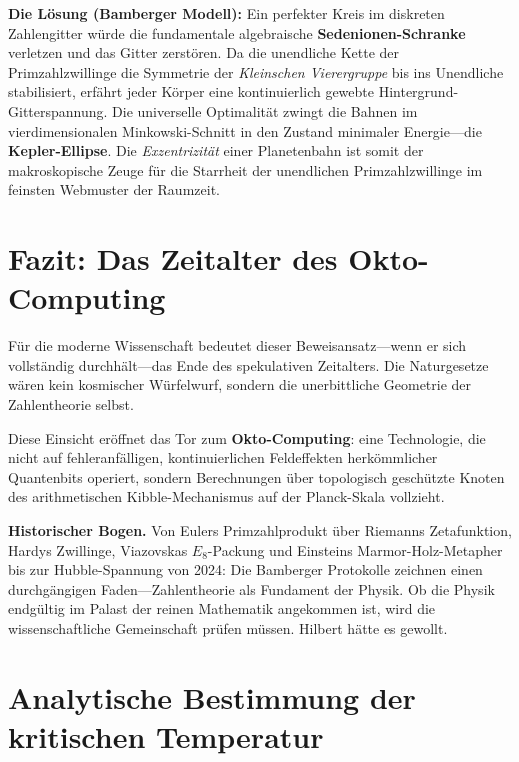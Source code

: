 \documentclass[11pt,a4paper]{article}
\newcommand{\Eoct}{E_8}
\begin{document}
\textbf{Die Lösung (Bamberger Modell):} Ein perfekter Kreis im diskreten Zahlengitter würde die fundamentale algebraische \textbf{Sedenionen-Schranke} verletzen und das Gitter zerstören. Da die unendliche Kette der Primzahlzwillinge die Symmetrie der \emph{Kleinschen Vierergruppe} bis ins Unendliche stabilisiert, erfährt jeder Körper eine kontinuierlich gewebte Hintergrund-Gitterspannung. Die universelle Optimalität zwingt die Bahnen im vierdimensionalen Minkowski-Schnitt in den Zustand minimaler Energie---die \textbf{Kepler-Ellipse}. Die \emph{Exzentrizität} einer Planetenbahn ist somit der makroskopische Zeuge für die Starrheit der unendlichen Primzahlzwillinge im feinsten Webmuster der Raumzeit.

\section{Fazit: Das Zeitalter des Okto-Computing}

Für die moderne Wissenschaft bedeutet dieser Beweisansatz---wenn er sich vollständig durchhält---das Ende des spekulativen Zeitalters. Die Naturgesetze wären kein kosmischer Würfelwurf, sondern die unerbittliche Geometrie der Zahlentheorie selbst.

Diese Einsicht eröffnet das Tor zum \textbf{Okto-Computing}: eine Technologie, die nicht auf fehleranfälligen, kontinuierlichen Feldeffekten herkömmlicher Quantenbits operiert, sondern Berechnungen über topologisch geschützte Knoten des arithmetischen Kibble-Mechanismus auf der Planck-Skala vollzieht.

\medskip
\noindent\textbf{Historischer Bogen.} Von Eulers Primzahlprodukt über Riemanns Zetafunktion, Hardys Zwillinge, Viazovskas $\Eoct$-Packung und Einsteins Marmor-Holz-Metapher bis zur Hubble-Spannung von 2024: Die Bamberger Protokolle zeichnen einen durchgängigen Faden---Zahlentheorie als Fundament der Physik. Ob die Physik endgültig im Palast der reinen Mathematik angekommen ist, wird die wissenschaftliche Gemeinschaft prüfen müssen. Hilbert hätte es gewollt.

\appendix
\section{Analytische Bestimmung der kritischen Temperatur}
\label{app:Tc-analytisch}
\end{document}
